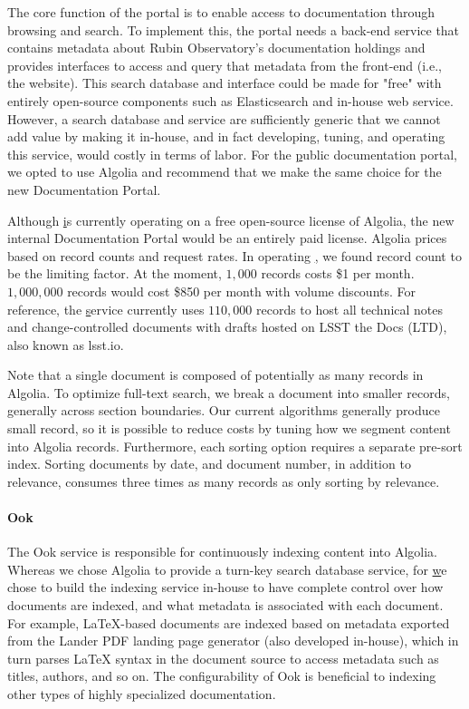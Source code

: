 The core function of the portal is to enable access to documentation through browsing and search.
To implement this, the portal needs a back-end service that contains metadata about Rubin Observatory's documentation holdings and provides interfaces to access and query that metadata from the front-end (i.e., the website).
This search database and interface could be made for "free" with entirely open-source components such as Elasticsearch \citep{elastic-cite} and in-house web service.
However, a search database and service are sufficiently generic that we cannot add value by making it in-house, and in fact developing, tuning, and operating this service, would costly in terms of labor.
For the \href{www.lsst.io} public documentation portal, we opted to use Algolia and recommend that we make the same choice for the new Documentation Portal.

Although \href{www.lsst.io} is currently operating on a free open-source license of Algolia, the new internal Documentation Portal would be an entirely paid license.
Algolia prices based on record counts and request rates.
In operating \href{www.lsst.io}, we found record count to be the limiting factor.
At the moment, $1,000$ records costs \$1 per month.
$1,000,000$ records would cost \$850 per month with volume discounts.
For reference, the \href{www.lsst.io} service currently uses $110,000$ records to host all technical notes and change-controlled documents with drafts hosted on LSST the Docs (LTD), also known as lsst.io.

Note that a single document is composed of potentially as many records in Algolia.
To optimize full-text search, we break a document into smaller records, generally across section boundaries.
Our current algorithms generally produce small record, so it is possible to reduce costs by tuning how we segment content into Algolia records.
Furthermore, each sorting option requires a separate pre-sort index.
Sorting documents by date, and document number, in addition to relevance, consumes three times as many records as only sorting by relevance.

\paragraph{Ook}

The Ook service is responsible for continuously indexing content into Algolia. \citep{ook-cite}
Whereas we chose Algolia to provide a turn-key search database service, for \href{www.lsst.io} we chose to build the indexing service in-house to have complete control over how documents are indexed, and what metadata is associated with each document.
For example, LaTeX-based documents are indexed based on metadata exported from the Lander PDF landing page generator (also developed in-house), which in turn parses LaTeX syntax in the document source to access metadata such as titles, authors, and so on.
The configurability of Ook is beneficial to indexing other types of highly specialized documentation.


